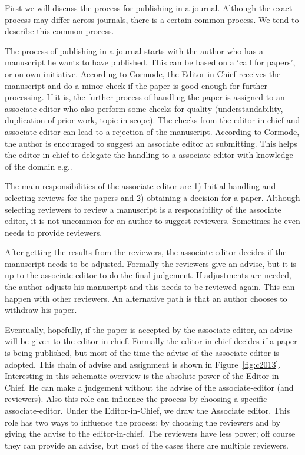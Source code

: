 \documentclass{ou-report}
\begin{document}
First we will discuss the process for publishing in a journal. Although the 
exact process may differ across journals, there is a certain common process. We 
tend to describe this common process.

The process of publishing in a journal starts with the author who has a manuscript 
he wants to have published. This can be based on a `call for papers', or on own 
initiative. According to Cormode, the Editor-in-Chief receives the manuscript 
and do a minor check if the paper is good enough for further processing. If it 
is, the further process of handling the paper is assigned to an associate editor 
who also perform some checks for quality (understandability, duplication of 
prior work, topic in scope). The checks from the editor-in-chief and associate 
editor can lead to a rejection of the manuscript. According to Cormode, the 
author is encouraged to suggest an associate editor at submitting. This helps 
the editor-in-chief to delegate the handling to a associate-editor with 
knowledge of the domain e.g..

The main responsibilities of the associate editor are 1) Initial handling and 
selecting reviews for the papers and 2) obtaining a decision for a paper. 
Although selecting reviewers to review a manuscript is a responsibility of the 
associate editor, it is not uncommon for an author to suggest reviewers. 
Sometimes he even needs to provide reviewers.

After getting the results from the reviewers, the associate editor decides if 
the manuscript needs to be adjusted. Formally the reviewers give an advise, but 
it is up to the associate editor to do the final judgement. If adjustments are 
needed, the author adjusts his manuscript and this needs to be reviewed again. 
This can happen with other reviewers. An alternative path is that an author 
chooses to withdraw his paper.

Eventually, hopefully, if the paper is accepted by the associate editor, an 
advise will be given to the editor-in-chief. Formally the editor-in-chief 
decides if a paper is being published, but most of the time the advise of the 
associate editor is adopted. This chain of advise and assignment is shown in 
Figure~\ref{fig:c2013}. Interesting in this schematic overview is the absolute 
power of the Editor-in-Chief. He can make a judgement without the advise of the 
associate-editor (and reviewers). Also this role can influence the process by 
choosing a specific associate-editor. Under the Editor-in-Chief, we draw the 
Associate editor. This role has two ways to influence the process; by choosing 
the reviewers and by giving the advise to the editor-in-chief. The reviewers 
have less power; off course they can provide an advise, but most of the cases 
there are multiple reviewers.
\end{document}
